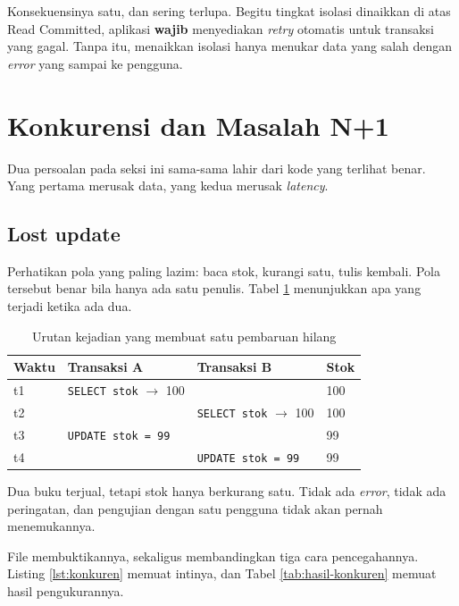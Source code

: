Konsekuensinya satu, dan sering terlupa. Begitu tingkat isolasi dinaikkan di
atas Read Committed, aplikasi \textbf{wajib} menyediakan \textit{retry} otomatis
untuk transaksi yang gagal. Tanpa itu, menaikkan isolasi hanya menukar data
yang salah dengan \textit{error} yang sampai ke pengguna.

\section{Konkurensi dan Masalah N+1}

Dua persoalan pada seksi ini sama-sama lahir dari kode yang terlihat benar.
Yang pertama merusak data, yang kedua merusak \textit{latency}.

\subsection*{Lost update}

Perhatikan pola yang paling lazim: baca stok, kurangi satu, tulis kembali. Pola
tersebut benar bila hanya ada satu penulis. Tabel \ref{tab:lost-update}
menunjukkan apa yang terjadi ketika ada dua.

\begin{table}[!htb]
  \centering
  \caption{Urutan kejadian yang membuat satu pembaruan hilang}
  \label{tab:lost-update}
  \begin{tabularx}{\textwidth}{lXXl}
    \hline
    \textbf{Waktu} & \textbf{Transaksi A} & \textbf{Transaksi B} & \textbf{Stok} \\
    \hline
    t1 & \texttt{SELECT stok} $\rightarrow$ 100 & & 100 \\
    \hline
    t2 & & \texttt{SELECT stok} $\rightarrow$ 100 & 100 \\
    \hline
    t3 & \texttt{UPDATE stok = 99} & & 99 \\
    \hline
    t4 & & \texttt{UPDATE stok = 99} & 99 \\
    \hline
  \end{tabularx}
\end{table}

Dua buku terjual, tetapi stok hanya berkurang satu. Tidak ada \textit{error}, tidak ada
peringatan, dan pengujian dengan satu pengguna tidak akan pernah menemukannya.

File  membuktikannya, sekaligus
membandingkan tiga cara pencegahannya. Listing \ref{lst:konkuren} memuat
intinya, dan Tabel \ref{tab:hasil-konkuren} memuat hasil pengukurannya.

